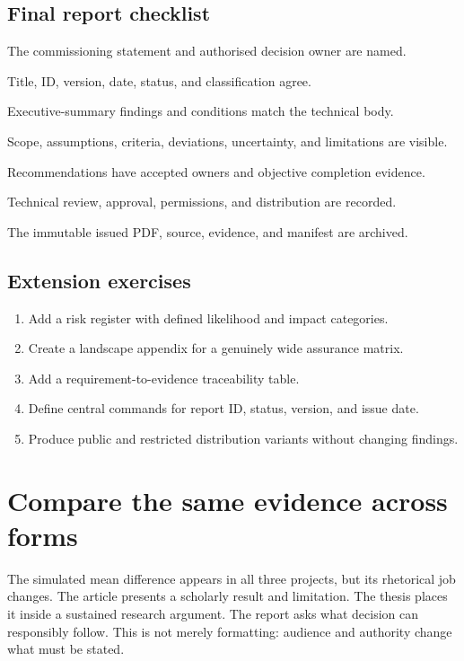 \subsection{Final report checklist}

\begin{chapterchecklist}
  \item The commissioning statement and authorised decision owner are named.
  \item Title, ID, version, date, status, and classification agree.
  \item Executive-summary findings and conditions match the technical body.
  \item Scope, assumptions, criteria, deviations, uncertainty, and limitations are visible.
  \item Recommendations have accepted owners and objective completion evidence.
  \item Technical review, approval, permissions, and distribution are recorded.
  \item The immutable issued PDF, source, evidence, and manifest are archived.
\end{chapterchecklist}

\subsection{Extension exercises}

\begin{enumerate}
  \item Add a risk register with defined likelihood and impact categories.
  \item Create a landscape appendix for a genuinely wide assurance matrix.
  \item Add a requirement-to-evidence traceability table.
  \item Define central commands for report ID, status, version, and issue date.
  \item Produce public and restricted distribution variants without changing findings.
\end{enumerate}

\section{Compare the same evidence across forms}

The simulated mean difference appears in all three projects, but its rhetorical
job changes. The article presents a scholarly result and limitation. The thesis
places it inside a sustained research argument. The report asks what decision
can responsibly follow. This is not merely formatting: audience and authority
change what must be stated.

